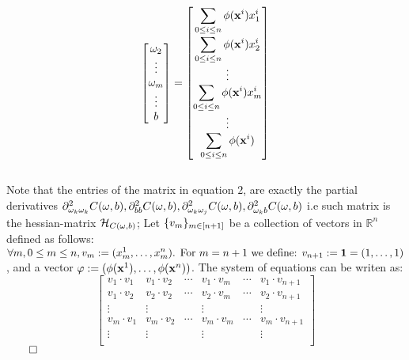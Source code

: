 \documentclass{exam}
\renewenvironment{proof}{{\noindent\itshape\ignorespaces}}{{\hfill$\qed$\\}}
\begin{document}
\begin{proof}
\begin{equation}
\begin{bmatrix}
            \omega_2\\
            \vdots \\
            \omega_m\\
           \vdots \\
            b
        \end{bmatrix} 
        = \begin{bmatrix}
            \displaystyle\sum_{\tiny 0 \leq i\leq n }\phi(\bold{x}^{i}) x^{i}_{1} \\[1.2em]
            \displaystyle\sum_{\tiny 0 \leq i\leq n }\phi(\bold{x}^{i}) x^{i}_{2}\\
            \vdots \\
            \displaystyle\sum_{\tiny 0 \leq i\leq n }\phi(\bold{x}^{i}) x^{i}_{m}\\
           \vdots \\
           \displaystyle\sum_{\tiny 0 \leq i\leq n }\phi(\bold{x}^{i})
        \end{bmatrix} 
\end{equation}
\\
Note that the entries of the matrix in equation $2$, are exactly the partial derivatives $\partial^2_{\omega_k\omega_k} C(\bold{\omega},b),\partial^2_{bb}C(\bold{\omega},b),\\
\partial^2_{\omega_k \omega_j} C(\bold{\omega},b),\partial^2_{\omega_k b} C(\bold{\omega},b)$ i.e such matrix is the hessian-matrix $\mathcal{H}_{C(\tiny \omega, b)}$; Let $\displaystyle\{ v_m \}_{\tiny m \in \left[ n + 1 \right]}$ be a collection of vectors in $\mathbb{R}^n$ defined as follows: $ \forall m, 0 \leq m \leq n, v_m := \displaystyle(x^{1}_{m}, \ldots ,x^{n}_{m}) \text{. For } m = n+1 \text{ we define: }v_{n+1} := \bold{1} = (1, \ldots ,1)$, and a vector $\bold{\varphi} := (\phi(\bold{x}^{1}), \ldots , \phi(\bold{x}^{n}))$. The system of equations 
can be writen as:\\
\begin{equation}
    \begin{bmatrix}
        v_1 \cdot v_1 & v_1 \cdot v_2 & \cdots & v_1 \cdot v_m & \cdots &v_1 \cdot v_{n+1}\\
        v_1 \cdot v_2 & v_2 \cdot v_2 & \cdots & v_2 \cdot v_m & \cdots &v_2 \cdot v_{n+1}\\
       \vdots  & \vdots  & \ & \vdots & \ & \vdots \\
       v_m \cdot v_1 & v_m \cdot v_2 & \cdots & v_m \cdot v_m & \cdots &v_m \cdot v_{n+1}\\
       \vdots  & \vdots  & \ & \vdots & \ & \vdots \\

\end{bmatrix}
\end{equation}
\end{proof}
\end{document}
